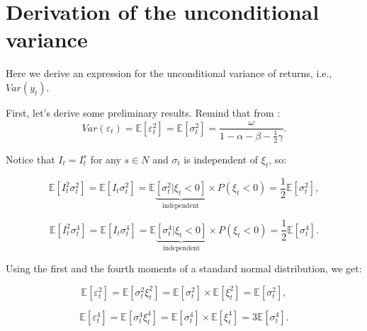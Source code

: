 \documentclass[authoryear, 1p]{elsarticle}
\numberwithin{equation}{section}
\begin{document}
 


\appendix
\section{Derivation of the unconditional variance}

Here we derive an expression for the unconditional variance of returns, i.e., $Var\left(y_{t}\right)$. 


\begin{pot}

First, let's derive some preliminary results.
Remind that from \citet{Glosten1993}:
\begin{equation}\label{eq:r0}
Var\left(\varepsilon_{t}\right) = \mathbb{E}\left[\varepsilon^2_{t}\right] = \mathbb{E}\left[\sigma^{2}_{t}\right]=\frac{\omega}{1 - \alpha - \beta - \frac{1}{2}\gamma}.
\end{equation}

Notice that $I_{t}=I_{t}^{s}$ for any $s\in N$ and $\sigma_{t}$ is independent of $\xi_{t}$, so:

\begin{equation}\label{eq:r1}
\mathbb{E}\left[I_{t}^{2}\sigma^{2}_{t}\right]=\mathbb{E}\left[I_{t}\sigma^{2}_{t}\right]=\mathbb{E}\underbrace{\left[\sigma^{2}_{t}|\xi_{t}<0\right]}_{\text{independent}} \times P\left(\xi_{t}<0\right)=\frac{1}{2}\mathbb{E}\left[\sigma^{2}_{t}\right],
\end{equation}

\begin{equation}\label{eq:r2}
\mathbb{E}\left[I_{t}^{2}\sigma^{4}_{t}\right]=\mathbb{E}\left[I_{t}\sigma^{4}_{t}\right]=\mathbb{E}\underbrace{\left[\sigma^{4}_{t}|\xi_{t}<0\right]}_{\text{independent}} \times P\left(\xi_{t}<0\right)=\frac{1}{2}\mathbb{E}\left[\sigma^{4}_{t}\right].
\end{equation}

Using the first and the fourth moments of a standard normal distribution, we get:

\begin{equation}\label{eq:r3}
\mathbb{E}\left[\varepsilon_{t}^{2}\right]=\mathbb{E}\left[\sigma_{t}^2\xi_{t}^2\right]=\mathbb{E}\left[\sigma_{t}^2\right] \times \mathbb{E}\left[\xi_{t}^2\right]=\mathbb{E}[\sigma^2_{t}],
\end{equation}

\begin{equation}\label{eq:r4}
\mathbb{E}\left[\varepsilon_{t}^{4}\right]=\mathbb{E}\left[\sigma_{t}^4\xi_{t}^4\right]=\mathbb{E}\left[\sigma_{t}^4\right] \times \mathbb{E}\left[\xi_{t}^4\right]=3\mathbb{E}\left[\sigma^4_{t}\right].
\end{equation}


\end{pot}
\end{document}
